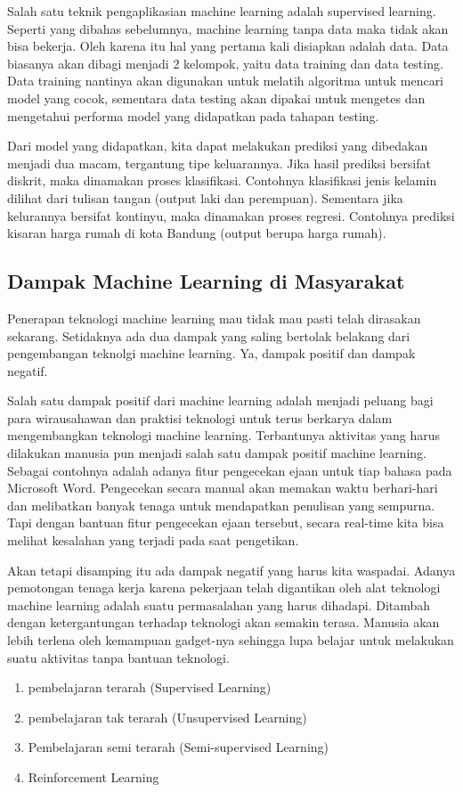 Salah satu teknik pengaplikasian machine learning adalah supervised learning. Seperti yang dibahas sebelumnya, machine learning tanpa data maka tidak akan bisa bekerja. Oleh karena itu hal yang pertama kali disiapkan adalah data. Data biasanya akan dibagi menjadi 2 kelompok, yaitu data training dan data testing. Data training nantinya akan digunakan untuk melatih algoritma untuk mencari model yang cocok, sementara data testing akan dipakai untuk mengetes dan mengetahui performa model yang didapatkan pada tahapan testing.
\par Dari model yang didapatkan, kita dapat melakukan prediksi yang dibedakan menjadi dua macam, tergantung tipe keluarannya. Jika hasil prediksi bersifat diskrit, maka dinamakan proses klasifikasi. Contohnya klasifikasi jenis kelamin dilihat dari tulisan tangan (output laki dan perempuan). Sementara jika kelurannya bersifat kontinyu, maka dinamakan proses regresi. Contohnya prediksi kisaran harga rumah di kota Bandung (output berupa harga rumah).

\subsection{Dampak Machine Learning di Masyarakat}
Penerapan teknologi machine learning mau tidak mau pasti telah dirasakan sekarang. Setidaknya ada dua dampak yang saling bertolak belakang dari pengembangan teknolgi machine learning. Ya, dampak positif dan dampak negatif.
\par Salah satu dampak positif dari machine learning adalah menjadi peluang bagi para wirausahawan dan praktisi teknologi untuk terus berkarya dalam mengembangkan teknologi machine learning. Terbantunya aktivitas yang harus dilakukan manusia pun menjadi salah satu dampak positif machine learning. Sebagai contohnya adalah adanya fitur pengecekan ejaan untuk tiap bahasa pada Microsoft Word. Pengecekan secara manual akan memakan waktu berhari-hari dan melibatkan banyak tenaga untuk mendapatkan penulisan yang sempurna. Tapi dengan bantuan fitur pengecekan ejaan tersebut, secara real-time kita bisa melihat kesalahan yang terjadi pada saat pengetikan.
\par Akan tetapi disamping itu ada dampak negatif yang harus kita waspadai. Adanya pemotongan tenaga kerja karena pekerjaan telah digantikan oleh alat teknologi machine learning adalah suatu permasalahan yang harus dihadapi. Ditambah dengan ketergantungan terhadap teknologi akan semakin terasa. Manusia akan lebih terlena oleh kemampuan gadget-nya sehingga lupa belajar untuk melakukan suatu aktivitas tanpa bantuan teknologi.

\begin{enumerate}
	\item pembelajaran terarah (Supervised Learning)
	\item pembelajaran tak terarah (Unsupervised Learning)
	\item Pembelajaran semi terarah (Semi-supervised Learning)
	\item Reinforcement Learning
\end{enumerate}